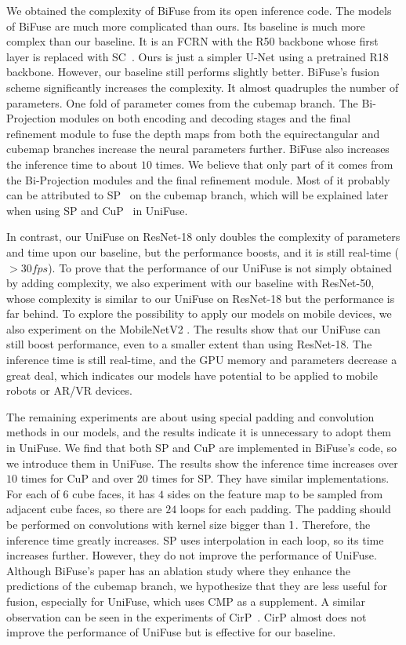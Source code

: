 \documentclass[letterpaper, 10 pt, conference]{ieeeconf}
\begin{document}
We obtained the complexity of BiFuse from its open inference code. The models of BiFuse are much more complicated than ours. 
{Its baseline is much more complex than our baseline. 
It is an FCRN \cite{laina2016deeper} with the R50 backbone whose first layer is replaced with SC~\cite{su2017learning}. Ours is just a simpler U-Net using a pretrained R18 backbone. However, our baseline still performs slightly better. }
BiFuse's fusion scheme significantly increases the complexity. It almost quadruples the number of parameters. One fold of parameter comes from the cubemap branch. The Bi-Projection modules on both encoding and decoding stages and the final refinement module to fuse the depth maps from both the equirectangular and cubemap branches increase the neural parameters further.
BiFuse also increases the inference time {to about $10$} times. We believe that only part of it comes from the Bi-Projection modules and the final refinement module. Most of it probably can be attributed to SP~\cite{wang2020bifuse} on the cubemap branch{, which will be explained later when using SP and CuP~\cite{cheng2018cube} in UniFuse}.

In contrast, our UniFuse on ResNet-18 only doubles the complexity of parameters and time upon our baseline, but the performance boosts, and it is still real-time ($>30fps$). To prove that the performance of our UniFuse is not simply obtained by adding complexity, we also experiment with our baseline with ResNet-50, whose complexity is similar to our UniFuse on ResNet-18 but the performance is far behind. To explore the possibility to apply our models on mobile devices, we also experiment on the MobileNetV2 \cite{sandler2018mobilenetv2}. The results show that our UniFuse can still boost performance, even to a smaller extent than using ResNet-18. The inference time is still real-time, and the GPU memory and parameters decrease a great deal, which indicates our models have potential to be applied to mobile robots or AR/VR devices.   

{The remaining experiments are about using special padding and convolution methods in our models, and the results indicate it is unnecessary to adopt them in UniFuse. We find that both SP and CuP are implemented in BiFuse's code, so we introduce them in UniFuse. The results show the inference time increases over $10$ times for CuP and over $20$ times for SP. They have similar implementations. For each of $6$ cube faces, it has $4$ sides on the feature map to be sampled from adjacent cube faces, so there are $24$ loops for each padding. The padding should be performed on convolutions with kernel size bigger than $1\time1$. Therefore, the inference time greatly increases. SP uses interpolation in each loop, so its time increases further. However, they do not improve the performance of UniFuse. Although BiFuse's paper has an ablation study where they enhance the predictions of the cubemap branch, we hypothesize that they are less useful for fusion, especially for UniFuse, which uses CMP as a supplement. 
A similar observation can be seen in the experiments of CirP~\cite{wang2018omnidirectional}. CirP almost does not improve the performance of UniFuse but is effective for our baseline. } 
\end{document}
